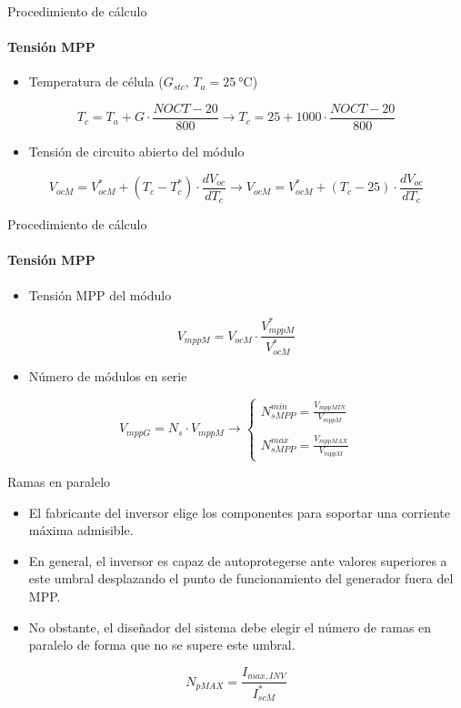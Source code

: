 \documentclass[aspectratio=169, usenames,svgnames,dvipsnames]{beamer}
\begin{document}
\begin{frame}[label={sec:org9068ba0}]{Procedimiento de cálculo}
\framesubtitle{Tensión MPP}
\begin{itemize}
\item Temperatura de célula (\(G_{stc},\, T_{a}=\SI{25}{\celsius}\))
\end{itemize}
\[
  T_{c} = T_{a} + G \cdot \frac{NOCT-20}{800} \rightarrow T_{c} = 25 + 1000 \cdot \frac{NOCT-20}{800}
\]
\begin{itemize}
\item Tensión de circuito abierto del módulo
\end{itemize}
\[
  V_{ocM} = V_{ocM}^{*} + (T_{c}-T_{c}^{*})\cdot\frac{dV_{oc}}{dT_{c}} \rightarrow
  V_{ocM} = V_{ocM}^{*} + (T_{c}- 25)\cdot\frac{dV_{oc}}{dT_{c}}
\]
\end{frame}
\begin{frame}[label={sec:orgfb6d2f7}]{Procedimiento de cálculo}
\framesubtitle{Tensión MPP}

\begin{itemize}
\item Tensión MPP del módulo
\end{itemize}
\[
  V_{mppM} = V_{ocM} \cdot \frac{V_{mppM}^*}{V_{ocM}^*}
\]
\begin{itemize}
\item Número de módulos en serie
\end{itemize}
\[
  V_{mppG} = N_s \cdot V_{mppM} \rightarrow
  \begin{cases}
    N_{sMPP}^{min} =\frac{V_{mppMIN}}{V_{mppM}}\\
    \\
    N_{sMPP}^{max} = \frac{V_{mppMAX}}{V_{mppM}}
  \end{cases}
\]
\end{frame}
\begin{frame}[label={sec:org08199cb}]{Ramas en paralelo}
\begin{itemize}
\item El fabricante del inversor elige los componentes para soportar una \alert{corriente máxima admisible}.

\item En general, el inversor es capaz de autoprotegerse ante valores superiores a este umbral desplazando el punto de funcionamiento del generador fuera del MPP.

\item No obstante, el diseñador del sistema debe elegir el número de ramas en paralelo de forma que no se supere este umbral.
\end{itemize}

\[
    N_{pMAX}=\frac{I_{max,INV}}{I_{scM}^{*}}
\]
\end{frame}
\end{document}
